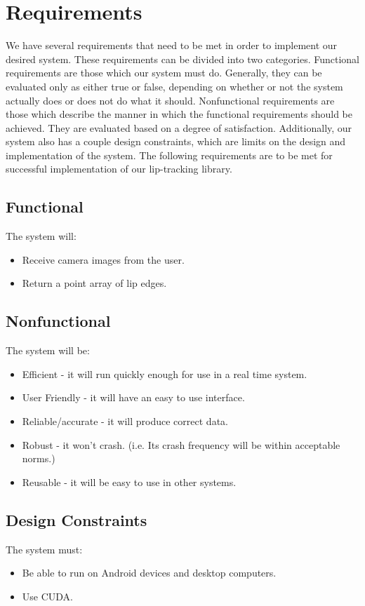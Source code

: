 \chapter{Requirements}

We have several requirements that need to be met in order to implement our desired system. These requirements can be divided into two categories. Functional requirements are those which our system must do. Generally, they can be evaluated only as either true or false, depending on whether or not the system actually does or does not do what it should. Nonfunctional requirements are those which describe the manner in which the functional requirements should be achieved. They are evaluated based on a degree of satisfaction. Additionally, our system also has a couple design constraints, which are limits on the design and implementation of the system. The following requirements are to be met for successful implementation of our lip-tracking library.

\section{Functional}
The system will:
\begin{itemize}
\item Receive camera images from the user.
\item Return a point array of lip edges.
\end{itemize}


\section{Nonfunctional}
The system will be:
\begin{itemize}
\item Efficient - it will run quickly enough for use in a real time system.
\item User Friendly - it will have an easy to use interface.
\item Reliable/accurate - it will produce correct data.
\item Robust - it won't crash. (i.e. Its crash frequency will be within acceptable norms.)
\item Reusable - it will be easy to use in other systems.
\end{itemize}


\section{Design Constraints}
The system must:
\begin{itemize}
\item Be able to run on Android devices and desktop computers.
\item Use CUDA.
\end{itemize}